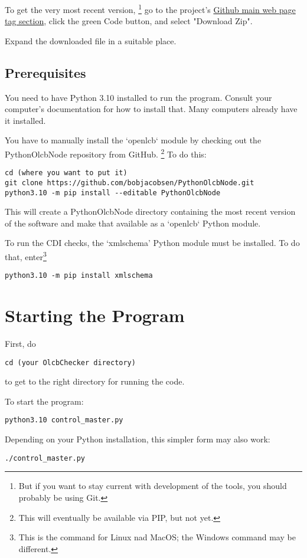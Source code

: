 \documentclass[11pt]{article}
\begin{document}
To get the very most recent version,
\footnote{But if you want to stay current with development of the tools, you should probably be using Git.}
go to the project's
\href{https://github.com/bobjacobsen/OlcbChecker}{Github main web page tag section},
click the green Code button, and select "Download Zip".

Expand the downloaded file in a suitable place.

\subsection{Prerequisites}

You need to have Python 3.10 installed to run the program. Consult your
computer's documentation for how to install that.  Many computers already
have it installed.

You have to manually install the `openlcb` module by checking out the 
PythonOlcbNode repository from GitHub.
\footnote{This will eventually be available via PIP, but not yet.}
To do this:
\begin{verbatim}
cd (where you want to put it)
git clone https://github.com/bobjacobsen/PythonOlcbNode.git
python3.10 -m pip install --editable PythonOlcbNode
\end{verbatim}
This will create a PythonOlcbNode directory containing the most recent version of the software
and make that available as a `openlcb` Python module.

To run the CDI checks, the `xmlschema' Python module must be installed. To do that, 
enter\footnote{This is the command for Linux nad MacOS; the Windows command may be different.}

\begin{verbatim}
python3.10 -m pip install xmlschema
\end{verbatim}

\section{Starting the Program}

First, do
\begin{verbatim}
cd (your OlcbChecker directory)
\end{verbatim}
to get to the right directory for running the code. 

To start the program:
\begin{verbatim}
python3.10 control_master.py
\end{verbatim}

Depending on your Python installation, this simpler form may also work:
\begin{verbatim}
./control_master.py
\end{verbatim}
\end{document}
